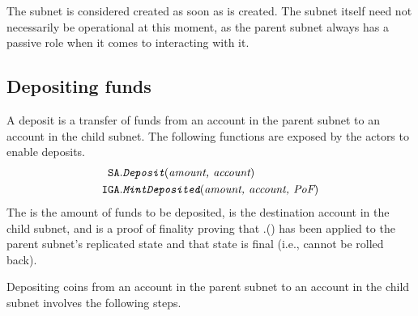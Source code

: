 The subnet is considered created as soon as \sa is created.
The subnet itself need not necessarily be operational at this moment,
as the parent subnet always has a passive role when it comes to interacting with it.

\subsection{Depositing funds}
\label{sec:deposit}

A deposit is a transfer of funds from an account in the parent subnet to an account in the child subnet.
The following functions are exposed by the \ipc actors to enable deposits.
\begin{align*}
    \texttt{SA}.&\textit{\texttt{Deposit}}(\textit{amount, account})\\
    \texttt{IGA}.&\textit{\texttt{MintDeposited}}(\textit{amount, account, \textit{PoF}})
\end{align*}
The  is the amount of funds to be deposited,  is the destination account in the child subnet, and \funcParam{\pof} is a proof of finality proving that \sa.() has been applied to the parent subnet's replicated state and that state is final (i.e., cannot be rolled back).

Depositing  coins from an account  in the parent subnet  to an account  in the child subnet 
involves the following steps.

